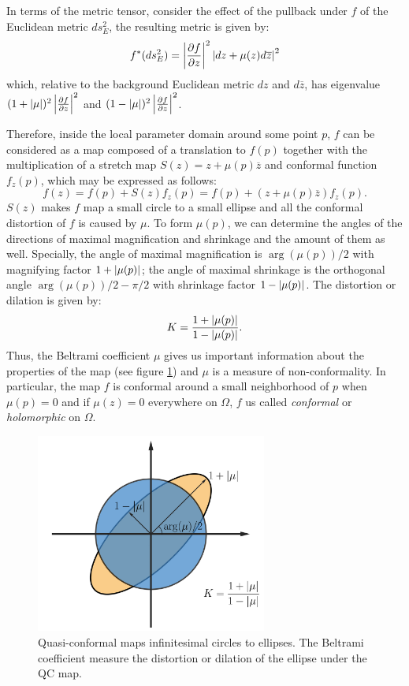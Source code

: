\documentclass[review,onefignum,onetabnum]{siamonline190516}
\begin{document}
In terms of the metric tensor, consider the effect of the pullback under $f$ of the Euclidean metric $ds^2_E$, the resulting metric is given by:
\begin{equation}
    f^*(ds^2_E) = \left\vert \frac{\partial f}{\partial z} \right\vert^2 \left\vert dz + \mu(z)d\overline{z} \right\vert^2
\end{equation}
which, relative to the background Euclidean metric $dz$ and $d\overline{z}$, has eigenvalue $(1+\left\vert \mu \right\vert)^2 \left\vert \frac{\partial f}{\partial z} \right\vert^2$ and $(1-\left\vert \mu \right\vert)^2 \left\vert \frac{\partial f}{\partial z} \right\vert^2$. 

Therefore, inside the local parameter domain around some point $p$, $f$ can be considered as a map composed of a translation to $f(p)$ together with the multiplication of a stretch map $S(z) = z + \mu(p)\overline{z}$ and conformal function $f_z(p)$, which may be expressed as follows:
\begin{equation}\label{local f}
    f(z) =  f(p)+S(z)f_z(p) = f(p)+(z+\mu(p)\overline{z})f_z(p).
\end{equation}
$S(z)$ makes $f$ map a small circle to a small ellipse and all the conformal distortion of $f$ is caused by $\mu$. To form $\mu(p)$, we can determine the angles of the directions of maximal magnification and shrinkage and the amount of them as well. Specially, the angle of maximal magnification is $\arg(\mu(p))/2$ with magnifying factor $1+\left\vert \mu(p) \right\vert$; the angle of maximal shrinkage is the orthogonal angle $\arg(\mu(p))/2 - \pi/2$ with shrinkage factor $1-\left\vert \mu(p) \right\vert$. The distortion or dilation is given by:
\begin{equation}
    K = \frac{1+\left\vert \mu(p) \right\vert}{1-\left\vert \mu(p) \right\vert}.
\end{equation}
Thus, the Beltrami coefficient $\mu$ gives us important information about the properties of the map (see figure \ref{fig3}) and $\mu$ is a measure of non-conformality. In particular, the map $f$ is conformal around a small neighborhood of $p$ when $\mu(p)=0$ and if $\mu(z)=0$ everywhere on $\Omega$, $f$ us called \textit{conformal} or \textit{holomorphic} on $\Omega$.

\begin{figure}
    \begin{center}
        \includegraphics[width=7.6cm]{fig3.png}
    \end{center}
    \caption{Quasi-conformal maps infinitesimal circles to ellipses. The Beltrami coefficient measure the distortion or dilation of the ellipse under the QC map.}
    \label{fig3}
\end{figure}
\end{document}
